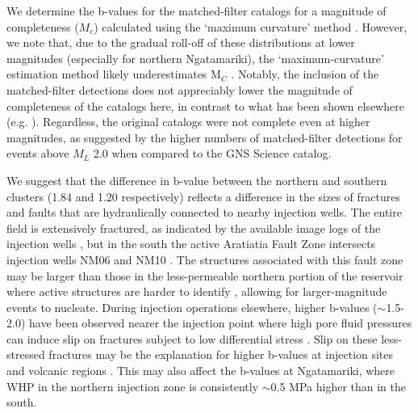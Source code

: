 We determine the b-values for the matched-filter catalogs for a magnitude of completeness ($M_c$) calculated using the `maximum curvature' method \citep{Wiemer_1997}. However, we note that, due to the gradual roll-off of these distributions at lower magnitudes (especially for northern Ngatamariki), the `maximum-curvature' estimation method likely underestimates M$_C$ \citep{Wiemer_2000}. Notably, the inclusion of the matched-filter detections does not appreciably lower the magnitude of completeness of the catalogs here, in contrast to what has been shown elsewhere (e.g. \citet{Shelly_2016}). Regardless, the original catalogs were not complete even at higher magnitudes, as suggested by the higher numbers of matched-filter detections for events above $M_L$ 2.0 when compared to the GNS Science catalog.

We suggest that the difference in b-value between the northern and southern clusters (1.84 and 1.20 respectively) reflects a difference in the sizes of fractures and faults that are hydraulically connected to nearby injection wells. The entire field is extensively fractured, as indicated by the available image logs of the injection wells \citep{nm09_report,nm10_report,massiot_2012}, but in the south the active Aratiatia Fault Zone intersects injection wells NM06 and NM10 \citep{nm10_report}. The structures associated with this fault zone may be larger than those in the less-permeable northern portion of the reservoir where active structures are harder to identify \citep{massiot_2012}, allowing for larger-magnitude events to nucleate. During injection operations elsewhere, higher b-values ($\sim$1.5-2.0) have been observed nearer the injection point where high pore fluid pressures can induce slip on fractures subject to low differential stress \citep[e.g.][]{Bachmann_2012}. Slip on these less-stressed fractures may be the explanation for higher b-values at injection sites and volcanic regions \citep{Wiemer_1998}. This may also affect the b-values at Ngatamariki, where \acrshort{WHP} in the northern injection zone is consistently $\sim$0.5 MPa higher than in the south.

